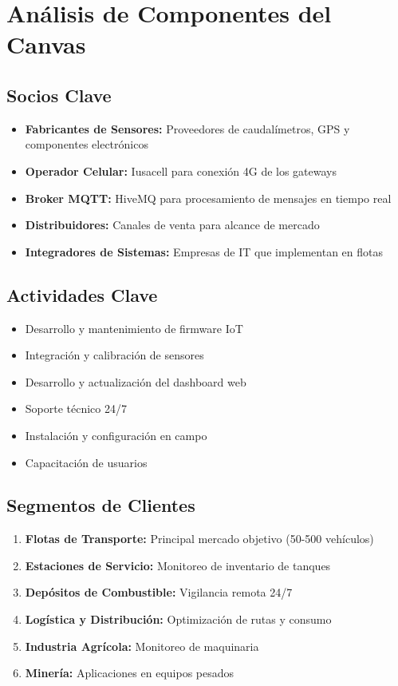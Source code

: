 \documentclass[12pt,a4paper,oneside]{report}
\begin{document}
\section{Análisis de Componentes del Canvas}

\subsection{Socios Clave}

\begin{itemize}
    \item \textbf{Fabricantes de Sensores:} Proveedores de caudalímetros, GPS y componentes electrónicos
    \item \textbf{Operador Celular:} Iusacell para conexión 4G de los gateways
    \item \textbf{Broker MQTT:} HiveMQ para procesamiento de mensajes en tiempo real
    \item \textbf{Distribuidores:} Canales de venta para alcance de mercado
    \item \textbf{Integradores de Sistemas:} Empresas de IT que implementan en flotas
\end{itemize}

\subsection{Actividades Clave}

\begin{itemize}
    \item Desarrollo y mantenimiento de firmware IoT
    \item Integración y calibración de sensores
    \item Desarrollo y actualización del dashboard web
    \item Soporte técnico 24/7
    \item Instalación y configuración en campo
    \item Capacitación de usuarios
\end{itemize}

\subsection{Segmentos de Clientes}

\begin{enumerate}
    \item \textbf{Flotas de Transporte:} Principal mercado objetivo (50-500 vehículos)
    \item \textbf{Estaciones de Servicio:} Monitoreo de inventario de tanques
    \item \textbf{Depósitos de Combustible:} Vigilancia remota 24/7
    \item \textbf{Logística y Distribución:} Optimización de rutas y consumo
    \item \textbf{Industria Agrícola:} Monitoreo de maquinaria
    \item \textbf{Minería:} Aplicaciones en equipos pesados
\end{enumerate}
\end{document}
